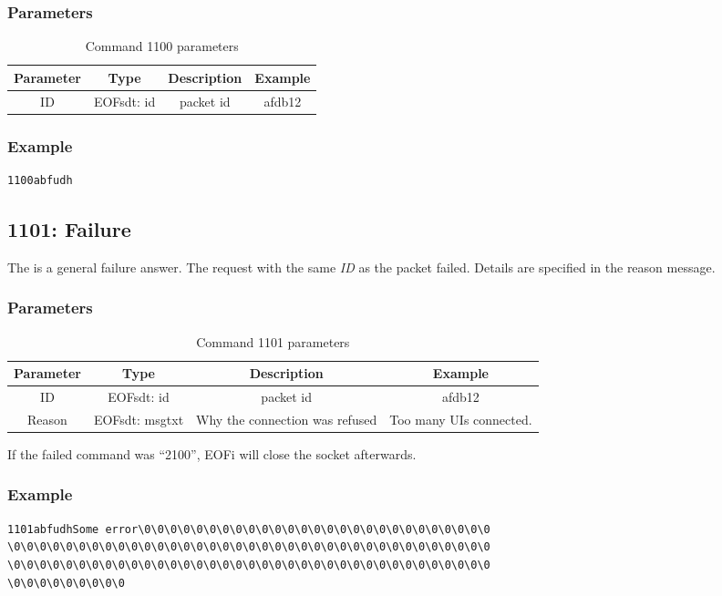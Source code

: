 \documentclass[12pt,a4paper]{book}
\begin{document}
\subsubsection{Parameters}
\begin{longtable}{|c|c|c|c|}
\caption{Command 1100 parameters}\\
\hline
\textbf{Parameter} & \textbf{Type} & \textbf{Description} & \textbf{Example}\\
\hline
ID & EOFsdt: id & packet id & afdb12\\
\hline
\end{longtable}
\subsubsection{Example}
\begin{verbatim}
1100abfudh
\end{verbatim}
\subsection{1101: Failure}
The is a general failure answer. The request with the
same \emph{ID} as the packet failed.
Details are specified in the reason message.
\subsubsection{Parameters}
\begin{longtable}{|c|c|c|c|}
\caption{Command 1101 parameters}\\
\hline
\textbf{Parameter} & \textbf{Type} & \textbf{Description} & \textbf{Example}\\
\hline
ID & EOFsdt: id & packet id & afdb12\\
\hline
Reason & EOFsdt: msgtxt & Why the connection was refused & Too many UIs connected.\\
\hline
\end{longtable}
If the failed command was "`2100"', EOFi will close the socket afterwards.
\subsubsection{Example}
\begin{verbatim}
1101abfudhSome error\0\0\0\0\0\0\0\0\0\0\0\0\0\0\0\0\0\0\0\0\0\0\0\0\0\0\0
\0\0\0\0\0\0\0\0\0\0\0\0\0\0\0\0\0\0\0\0\0\0\0\0\0\0\0\0\0\0\0\0\0\0\0\0\0
\0\0\0\0\0\0\0\0\0\0\0\0\0\0\0\0\0\0\0\0\0\0\0\0\0\0\0\0\0\0\0\0\0\0\0\0\0
\0\0\0\0\0\0\0\0\0
\end{verbatim}
\end{document}
